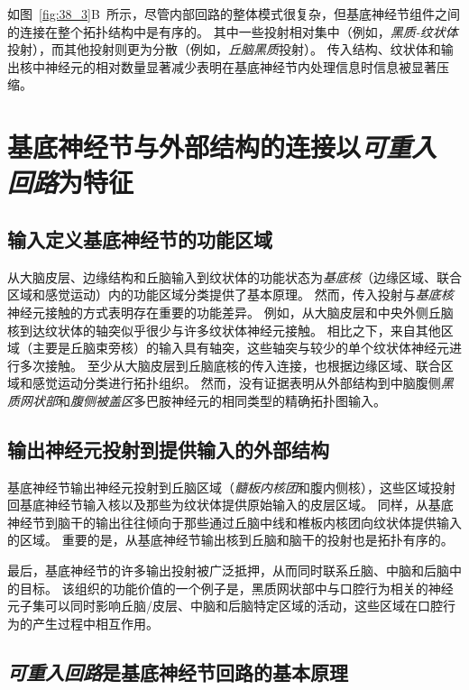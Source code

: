 如图~\ref{fig:38_3}B~所示，尽管内部回路的整体模式很复杂，但基底神经节组件之间的连接在整个拓扑结构中是有序的。
其中一些投射相对集中（例如，\textit{黑质-纹状体}投射），而其他投射则更为分散（例如，\textit{丘脑黑质}投射）。
传入结构、纹状体和输出核中神经元的相对数量显著减少表明在基底神经节内处理信息时信息被显著压缩。

\section{基底神经节与外部结构的连接以\textit{可重入回路}为特征}

\subsection{输入定义基底神经节的功能区域}

从大脑皮层、边缘结构和丘脑输入到纹状体的功能状态为\textit{基底核}（边缘区域、联合区域和感觉运动）内的功能区域分类提供了基本原理。
然而，传入投射与\textit{基底核}神经元接触的方式表明存在重要的功能差异。
例如，从大脑皮层和中央外侧丘脑核到达纹状体的轴突似乎很少与许多纹状体神经元接触。
相比之下，来自其他区域（主要是丘脑束旁核）的输入具有轴突，这些轴突与较少的单个纹状体神经元进行多次接触。
至少从大脑皮层到丘脑底核的传入连接，也根据边缘区域、联合区域和感觉运动分类进行拓扑组织。
然而，没有证据表明从外部结构到中脑腹侧\textit{黑质网状部}和\textit{腹侧被盖区}多巴胺神经元的相同类型的精确拓扑图输入。



\subsection{输出神经元投射到提供输入的外部结构}

基底神经节输出神经元投射到丘脑区域（\textit{髓板内核团}和腹内侧核），这些区域投射回基底神经节输入核以及那些为纹状体提供原始输入的皮层区域。
同样，从基底神经节到脑干的输出往往倾向于那些通过丘脑中线和椎板内核团向纹状体提供输入的区域。
重要的是，从基底神经节输出核到丘脑和脑干的投射也是拓扑有序的。


最后，基底神经节的许多输出投射被广泛抵押，从而同时联系丘脑、中脑和后脑中的目标。
该组织的功能价值的一个例子是，黑质网状部中与口腔行为相关的神经元子集可以同时影响丘脑/皮层、中脑和后脑特定区域的活动，这些区域在口腔行为的产生过程中相互作用。



\subsection{\textit{可重入回路}是基底神经节回路的基本原理}

